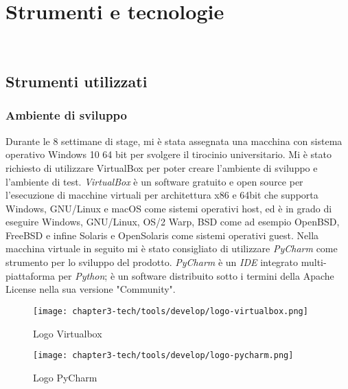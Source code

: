 
\chapter{Strumenti e tecnologie}
\label{cap:strumenti-e-tecnologie}

\\

\section{Strumenti utilizzati}

\subsection{Ambiente di sviluppo}
Durante le 8 settimane di stage, mi è stata assegnata una macchina con sistema operativo Windows 10 64 bit per svolgere il tirocinio universitario. Mi è stato richiesto di utilizzare VirtualBox per poter creare l'ambiente di sviluppo e l'ambiente di test. \emph{VirtualBox} è un software gratuito e open source per l'esecuzione di macchine virtuali per architettura x86 e 64bit che supporta Windows, GNU/Linux e macOS come sistemi operativi host, ed è in grado di eseguire Windows, GNU/Linux, OS/2 Warp, BSD come ad esempio OpenBSD, FreeBSD e infine Solaris e OpenSolaris come sistemi operativi guest.\newline{}
Nella macchina virtuale in seguito mi è stato consigliato di utilizzare \emph{PyCharm} come strumento per lo sviluppo del prodotto. \emph{PyCharm} è un \emph{IDE} integrato multi-piattaforma per \emph{Python}; è un software distribuito sotto i termini della Apache License nella sua versione "Community".
\begin{figure}[!h]
    \begin{minipage}{.5\textwidth} 
        \centering 
        \texttt{[image: chapter3-tech/tools/develop/logo-virtualbox.png]} 
        \caption{Logo Virtualbox} 
        \label{fig:virtualbox} 
    \end{minipage}%
    \begin{minipage}{.5\textwidth} 
        \centering 
        \texttt{[image: chapter3-tech/tools/develop/logo-pycharm.png]} 
        \caption{Logo PyCharm} 
        \label{fig:pycharm} 
    \end{minipage}  
\end{figure}

